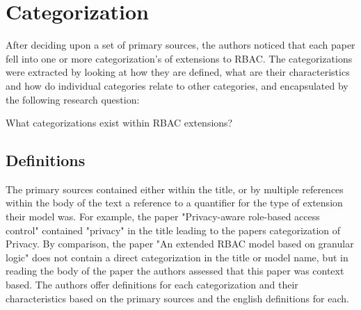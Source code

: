 \section{Categorization}

After deciding upon a set of primary sources, the authors noticed that each paper fell into one or more categorization's of extensions to RBAC.
The categorizations were extracted by looking at how they are defined, what are their characteristics and how do individual categories relate
to other categories, and encapsulated by the following research question:

What categorizations exist within RBAC extensions? \\

\subsection{Definitions}

The primary sources contained either within the title, or by multiple references within the body of the text a reference to a quantifier for the
type of extension their model was.  For example, the paper "Privacy-aware role-based access control" \cite{ni2010privacy} contained "privacy" in
the title leading to the papers categorization of Privacy.  By comparison, the paper "An extended RBAC model based on granular logic" \cite{jian2008extended}
does not contain a direct categorization in the title or model name, but in reading the body of the paper the authors assessed that this paper was 
context based.  The authors offer definitions for each categorization and their characteristics based on the primary sources and the english definitions
for each.


